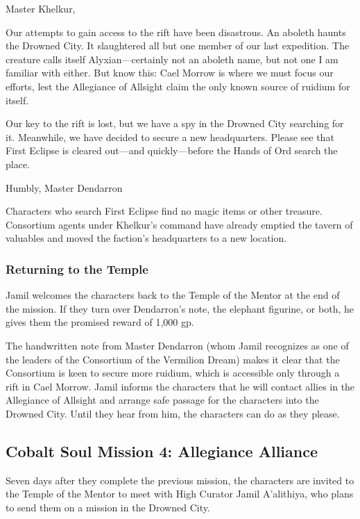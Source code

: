 \documentclass[10pt,a4paper,twoside,twocolumn,openany,nodeprecatedcode]{dndbook}
\begin{document}
\begin{DndReadAloud}{}
Master Khelkur,

Our attempts to gain access to the rift have been disastrous. An aboleth haunts the Drowned City. It slaughtered all but one member of our last expedition. The creature calls itself Alyxian—certainly not an aboleth name, but not one I am familiar with either. But know this: Cael Morrow is where we must focus our efforts, lest the Allegiance of Allsight claim the only known source of ruidium for itself.

Our key to the rift is lost, but we have a spy in the Drowned City searching for it. Meanwhile, we have decided to secure a new headquarters. Please see that First Eclipse is cleared out—and quickly—before the Hands of Ord search the place.

Humbly, Master Dendarron

\end{DndReadAloud}

Characters who search First Eclipse find no magic items or other treasure. Consortium agents under Khelkur's command have already emptied the tavern of valuables and moved the faction's headquarters to a new location.

\subsubsection{Returning to the Temple}
Jamil welcomes the characters back to the Temple of the Mentor at the end of the mission. If they turn over Dendarron's note, the elephant figurine, or both, he gives them the promised reward of 1,000 gp.

The handwritten note from Master Dendarron (whom Jamil recognizes as one of the leaders of the Consortium of the Vermilion Dream) makes it clear that the Consortium is keen to secure more ruidium, which is accessible only through a rift in Cael Morrow. Jamil informs the characters that he will contact allies in the Allegiance of Allsight and arrange safe passage for the characters into the Drowned City. Until they hear from him, the characters can do as they please.

\subsection{Cobalt Soul Mission 4: Allegiance Alliance}
Seven days after they complete the previous mission, the characters are invited to the Temple of the Mentor to meet with High Curator Jamil A'alithiya, who plans to send them on a mission in the Drowned City.
\end{document}
